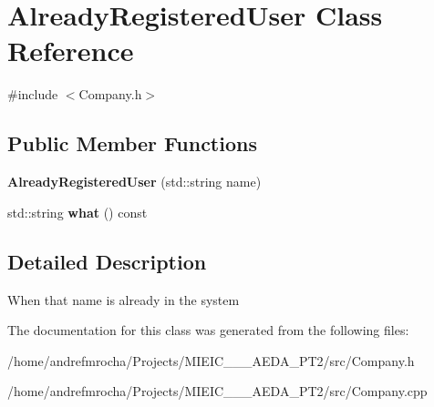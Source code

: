 \hypertarget{class_already_registered_user}{}\section{Already\+Registered\+User Class Reference}
\label{class_already_registered_user}


{\ttfamily \#include $<$Company.\+h$>$}

\subsection*{Public Member Functions}
\begin{DoxyCompactItemize}
\item 
\mbox{\label{class_already_registered_user_a8daf190044233235e28f8c53e922fabd}} 
{\bfseries Already\+Registered\+User} (std\+::string name)
\item 
\mbox{\label{class_already_registered_user_ae9f46091d164347cc12e45591d86d5a5}} 
std\+::string {\bfseries what} () const
\end{DoxyCompactItemize}


\subsection{Detailed Description}
When that name is already in the system 

The documentation for this class was generated from the following files\+:\begin{DoxyCompactItemize}
\item 
/home/andrefmrocha/\+Projects/\+M\+I\+E\+I\+C\+\_\+\_\+\_\+\+A\+E\+D\+A\+\_\+\+P\+T2/src/Company.\+h\item 
/home/andrefmrocha/\+Projects/\+M\+I\+E\+I\+C\+\_\+\_\+\_\+\+A\+E\+D\+A\+\_\+\+P\+T2/src/Company.\+cpp\end{DoxyCompactItemize}
